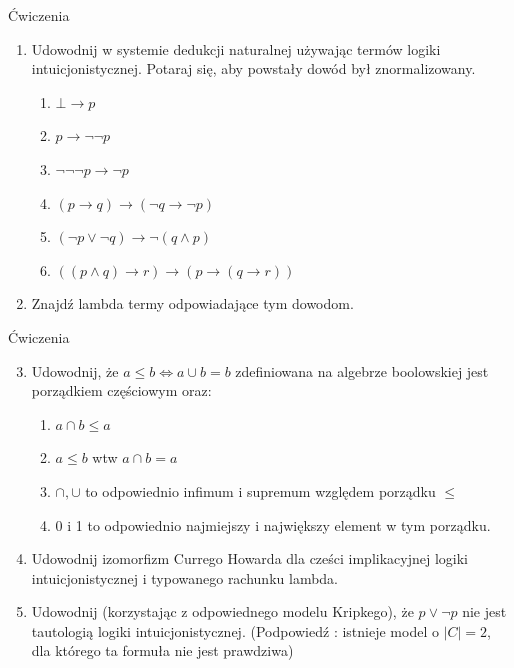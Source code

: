 \documentclass{beamer}
\begin{document}
\begin{frame}{Ćwiczenia}
\begin{enumerate}

	\item Udowodnij w systemie dedukcji naturalnej używając termów logiki intuicjonistycznej. Potaraj się, aby powstały dowód był znormalizowany.
	\begin{enumerate}
 \item \( \bot \rightarrow p\)
 \item \( p \rightarrow \neg \neg p \)
 \item \( \neg \neg \neg p \rightarrow \neg p\)
 \item \( (p \rightarrow q) \rightarrow (\neg q \rightarrow \neg p ) \)
 \item \( (\neg p \vee \neg q) \rightarrow \neg ( q \wedge p ) \)
 \item \( (( p \wedge q) \rightarrow r) \rightarrow ( p \rightarrow ( q \rightarrow r )) \)
\end{enumerate}
	\item Znajdź lambda termy odpowiadające tym dowodom. 
	\end{enumerate}
\end{frame}


\begin{frame}{Ćwiczenia}
\begin{enumerate}
	\setcounter{enumi}{2}
	\item Udowodnij,  że \( a \leq b \Leftrightarrow a \cup b = b\) zdefiniowana na algebrze boolowskiej jest porządkiem częściowym oraz: 
	\begin{enumerate}
	\item \( a \cap b  \leq a\)
	\item \( a \leq b\) wtw \( a \cap b = a\)
	\item \( \cap , \cup\) to odpowiednio infimum i supremum względem porządku \( \leq\) 
	\item  0 i 1 to odpowiednio najmiejszy i największy element w tym porządku.
	\end{enumerate}
	\item Udowodnij izomorfizm Currego Howarda dla cześci implikacyjnej logiki intuicjonistycznej i typowanego rachunku lambda.
	\item Udowodnij (korzystając z odpowiednego modelu Kripkego), że \( p \vee \neg p \) nie jest tautologią logiki intuicjonistycznej. (Podpowiedź : istnieje model o \( |C| = 2\), dla którego ta formuła nie jest prawdziwa)
\end{enumerate}


\end{frame}
\end{document}
